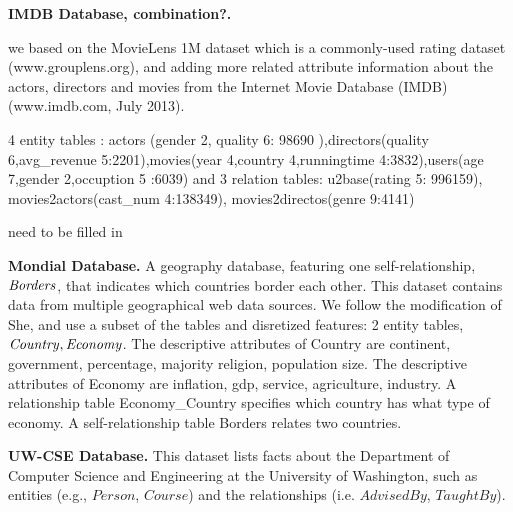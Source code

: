 \documentclass{article}
\begin{document}
\noindent\textbf{IMDB Database, combination?.}

we based on the MovieLens 1M dataset which is a commonly-used rating dataset (www.grouplens.org), and adding more related attribute information about the actors, directors and movies from the Internet Movie Database (IMDB) (www.imdb.com, July 2013).

4 entity tables : actors (gender 2, quality 6: 98690 ),directors(quality 6,avg\_revenue 5:2201),movies(year 4,country 4,runningtime 4:3832),users(age 7,gender 2,occuption 5 :6039)
and 3 relation tables: u2base(rating 5: 996159), movies2actors(cast\_num 4:138349), movies2directos(genre 9:4141)

need to be filled in


\noindent\textbf{Mondial Database.} A geography database, featuring
one self-relationship, $\it{Borders}$, that indicates which countries border each other. 
This dataset contains data from multiple geographical web data sources. 
We follow the modification of She\cite{wangMondial}, and use a subset of the tables and disretized features: 2 entity tables, $\it{Country},\it{Economy}$. The descriptive attributes of Country are continent, government, percentage, majority religion, population size. The descriptive attributes of Economy are inflation, gdp, service, agriculture, industry. A relationship table Economy\_Country specifies which country has what type of economy. A self-relationship table Borders relates two countries.


\noindent\textbf{UW-CSE Database.}
This dataset lists facts about the Department of Computer Science and Engineering at the University of Washington, such as entities (e.g., $Person$, $Course$) and the relationships (i.e. $AdvisedBy$, $TaughtBy$).
\end{document}
